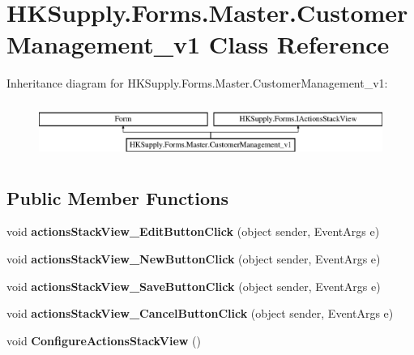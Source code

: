 \hypertarget{class_h_k_supply_1_1_forms_1_1_master_1_1_customer_management__v1}{}\section{H\+K\+Supply.\+Forms.\+Master.\+Customer\+Management\+\_\+v1 Class Reference}
\label{class_h_k_supply_1_1_forms_1_1_master_1_1_customer_management__v1}
Inheritance diagram for H\+K\+Supply.\+Forms.\+Master.\+Customer\+Management\+\_\+v1\+:\begin{figure}[H]
\begin{center}
\leavevmode
\includegraphics[height=1.818182cm]{class_h_k_supply_1_1_forms_1_1_master_1_1_customer_management__v1}
\end{center}
\end{figure}
\subsection*{Public Member Functions}
\begin{DoxyCompactItemize}
\item 
\mbox{\label{class_h_k_supply_1_1_forms_1_1_master_1_1_customer_management__v1_af88bd2df444413cebd33e14c2effb0e5}} 
void {\bfseries actions\+Stack\+View\+\_\+\+Edit\+Button\+Click} (object sender, Event\+Args e)
\item 
\mbox{\label{class_h_k_supply_1_1_forms_1_1_master_1_1_customer_management__v1_a3fb6447acbfb050f9ae46ba91273f0d1}} 
void {\bfseries actions\+Stack\+View\+\_\+\+New\+Button\+Click} (object sender, Event\+Args e)
\item 
\mbox{\label{class_h_k_supply_1_1_forms_1_1_master_1_1_customer_management__v1_aa69dd5455cdea167d6f7e542ece0cc66}} 
void {\bfseries actions\+Stack\+View\+\_\+\+Save\+Button\+Click} (object sender, Event\+Args e)
\item 
\mbox{\label{class_h_k_supply_1_1_forms_1_1_master_1_1_customer_management__v1_a82fcaa58f069f4c8004e81e224735606}} 
void {\bfseries actions\+Stack\+View\+\_\+\+Cancel\+Button\+Click} (object sender, Event\+Args e)
\item 
\mbox{\label{class_h_k_supply_1_1_forms_1_1_master_1_1_customer_management__v1_a0082f1b8932943afd01506be6fbe00fb}} 
void {\bfseries Configure\+Actions\+Stack\+View} ()
\end{DoxyCompactItemize}
